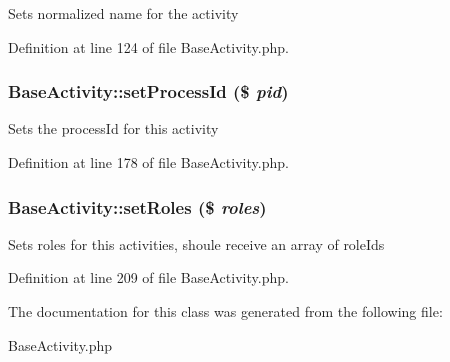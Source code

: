 Sets normalized name for the activity 

Definition at line 124 of file Base\-Activity.php.
\subsubsection{\setlength{\rightskip}{0pt plus 5cm}Base\-Activity::set\-Process\-Id (\$ {\em pid})}\label{classBaseActivity_a15}


Sets the process\-Id for this activity 

Definition at line 178 of file Base\-Activity.php.
\subsubsection{\setlength{\rightskip}{0pt plus 5cm}Base\-Activity::set\-Roles (\$ {\em roles})}\label{classBaseActivity_a20}


Sets roles for this activities, shoule receive an array of role\-Ids 

Definition at line 209 of file Base\-Activity.php.

The documentation for this class was generated from the following file:\begin{CompactItemize}
\item 
Base\-Activity.php\end{CompactItemize}
